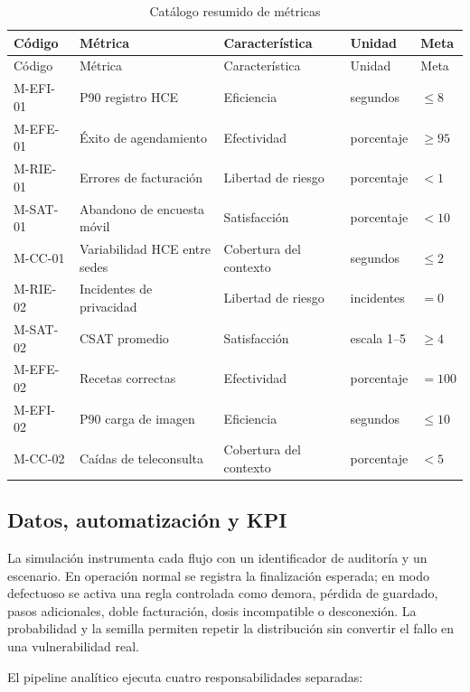\begin{longtable}{p{1.6cm}p{3.6cm}p{2.6cm}p{2.0cm}p{2.1cm}}
\caption{Catálogo resumido de métricas}\label{tab:catalog}\\
\toprule
Código & Métrica & Característica & Unidad & Meta \\
\midrule
\endfirsthead
\toprule
Código & Métrica & Característica & Unidad & Meta \\
\midrule
\endhead
M-EFI-01 & P90 registro HCE & Eficiencia & segundos & $\leq 8$ \\
M-EFE-01 & Éxito de agendamiento & Efectividad & porcentaje & $\geq 95$ \\
M-RIE-01 & Errores de facturación & Libertad de riesgo & porcentaje & $<1$ \\
M-SAT-01 & Abandono de encuesta móvil & Satisfacción & porcentaje & $<10$ \\
M-CC-01 & Variabilidad HCE entre sedes & Cobertura del contexto & segundos & $\leq 2$ \\
M-RIE-02 & Incidentes de privacidad & Libertad de riesgo & incidentes & $=0$ \\
M-SAT-02 & CSAT promedio & Satisfacción & escala 1--5 & $\geq 4$ \\
M-EFE-02 & Recetas correctas & Efectividad & porcentaje & $=100$ \\
M-EFI-02 & P90 carga de imagen & Eficiencia & segundos & $\leq 10$ \\
M-CC-02 & Caídas de teleconsulta & Cobertura del contexto & porcentaje & $<5$ \\
\bottomrule
\end{longtable}

\subsection{Datos, automatización y KPI}


La simulación instrumenta cada flujo con un identificador de auditoría y un escenario. En operación normal se registra la finalización esperada; en modo defectuoso se activa una regla controlada como demora, pérdida de guardado, pasos adicionales, doble facturación, dosis incompatible o desconexión. La probabilidad y la semilla permiten repetir la distribución sin convertir el fallo en una vulnerabilidad real.

El pipeline analítico ejecuta cuatro responsabilidades separadas:

